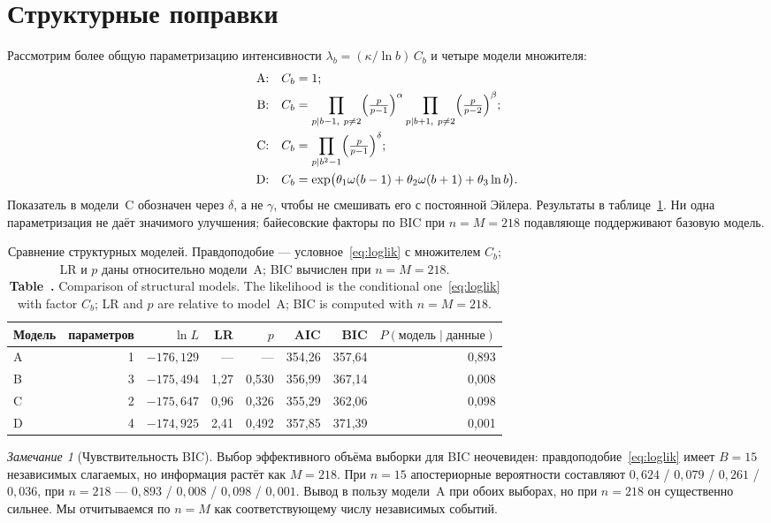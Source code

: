 \documentclass[11pt,a4paper]{article}
\newcommand{\encaptab}[1]{\\[3pt]\foreignlanguage{english}{%
  \textbf{Table~\thetable.} #1}}
\theoremstyle{plain}
\theoremstyle{remark}
\newtheorem{remark}{Замечание}
\begin{document}
\section{Структурные поправки}\label{sec:struct}

Рассмотрим более общую параметризацию интенсивности $\lambda_b=(\kappa/\ln b)\,C_b$
и четыре модели множителя:
\begin{align*}
\text{A:}&\quad C_b=1;\\
\text{B:}&\quad C_b=\prod_{p\mid b-1,\ p\ne2}\Bigl(\tfrac{p}{p-1}\Bigr)^{\alpha}
                 \prod_{p\mid b+1,\ p\ne2}\Bigl(\tfrac{p}{p-2}\Bigr)^{\beta};\\
\text{C:}&\quad C_b=\prod_{p\mid b^2-1}\Bigl(\tfrac{p}{p-1}\Bigr)^{\delta};\\
\text{D:}&\quad C_b=\exp\bigl(\theta_1\omega(b-1)+\theta_2\omega(b+1)+\theta_3\ln b\bigr).
\end{align*}
Показатель в модели~C обозначен через $\delta$, а не $\gamma$, чтобы не смешивать его
с постоянной Эйлера. Результаты в таблице~\ref{tab:struct}. Ни одна параметризация не
даёт значимого улучшения; байесовские факторы по BIC при $n=M=218$ подавляюще
поддерживают базовую модель.

\begin{table}[t]
\centering
\caption{Сравнение структурных моделей. Правдоподобие --- условное~\eqref{eq:loglik}
с множителем $C_b$; LR и $p$ даны относительно модели~A; BIC вычислен при $n=M=218$.
\encaptab{Comparison of structural models. The likelihood is the
conditional one~\eqref{eq:loglik} with factor $C_b$; LR and $p$ are relative to
model~A; BIC is computed with $n=M=218$.}}
\label{tab:struct}
\small
\begin{tabular}{lrrrrrrr}
\toprule
Модель & параметров & $\ln L$ & LR & $p$ & AIC & BIC & $P(\text{модель}\mid\text{данные})$\\
\midrule
A & 1 & $-176{,}129$ & --- & --- & 354{,}26 & 357{,}64 & 0{,}893\\
B & 3 & $-175{,}494$ & 1{,}27 & 0{,}530 & 356{,}99 & 367{,}14 & 0{,}008\\
C & 2 & $-175{,}647$ & 0{,}96 & 0{,}326 & 355{,}29 & 362{,}06 & 0{,}098\\
D & 4 & $-174{,}925$ & 2{,}41 & 0{,}492 & 357{,}85 & 371{,}39 & 0{,}001\\
\bottomrule
\end{tabular}
\end{table}

\begin{remark}[Чувствительность BIC]
Выбор эффективного объёма выборки для BIC неочевиден: правдоподобие~\eqref{eq:loglik}
имеет $B=15$ независимых слагаемых, но информация растёт как $M=218$. При $n=15$
апостериорные вероятности составляют $0{,}624$ / $0{,}079$ / $0{,}261$ / $0{,}036$,
при $n=218$ --- $0{,}893$ / $0{,}008$ / $0{,}098$ / $0{,}001$. Вывод в пользу модели~A
при обоих выборах, но при $n=218$ он существенно сильнее. Мы отчитываемся по $n=M$
как соответствующему числу независимых событий.
\end{remark}
\end{document}
